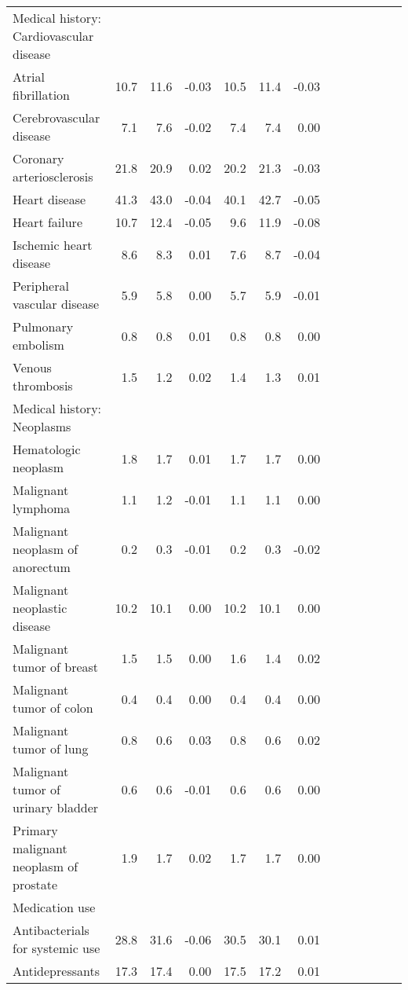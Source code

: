 \documentclass[11pt,]{article}
\begin{document}
\begin{longtable}{lrrrrrrrrrrrr}
  Medical history: Cardiovascular disease &    &    &     &    &    &     \\ 
      Atrial fibrillation & 10.7 & 11.6 & -0.03 & 10.5 & 11.4 & -0.03 \\ 
      Cerebrovascular disease &  7.1 &  7.6 & -0.02 &  7.4 &  7.4 &  0.00 \\ 
      Coronary arteriosclerosis & 21.8 & 20.9 &  0.02 & 20.2 & 21.3 & -0.03 \\ 
      Heart disease & 41.3 & 43.0 & -0.04 & 40.1 & 42.7 & -0.05 \\ 
      Heart failure & 10.7 & 12.4 & -0.05 &  9.6 & 11.9 & -0.08 \\ 
      Ischemic heart disease &  8.6 &  8.3 &  0.01 &  7.6 &  8.7 & -0.04 \\ 
      Peripheral vascular disease &  5.9 &  5.8 &  0.00 &  5.7 &  5.9 & -0.01 \\ 
      Pulmonary embolism &  0.8 &  0.8 &  0.01 &  0.8 &  0.8 &  0.00 \\ 
      Venous thrombosis &  1.5 &  1.2 &  0.02 &  1.4 &  1.3 &  0.01 \\ 
  Medical history: Neoplasms &    &    &     &    &    &     \\ 
      Hematologic neoplasm &  1.8 &  1.7 &  0.01 &  1.7 &  1.7 &  0.00 \\ 
      Malignant lymphoma &  1.1 &  1.2 & -0.01 &  1.1 &  1.1 &  0.00 \\ 
      Malignant neoplasm of anorectum &  0.2 &  0.3 & -0.01 &  0.2 &  0.3 & -0.02 \\ 
      Malignant neoplastic disease & 10.2 & 10.1 &  0.00 & 10.2 & 10.1 &  0.00 \\ 
      Malignant tumor of breast &  1.5 &  1.5 &  0.00 &  1.6 &  1.4 &  0.02 \\ 
      Malignant tumor of colon &  0.4 &  0.4 &  0.00 &  0.4 &  0.4 &  0.00 \\ 
      Malignant tumor of lung &  0.8 &  0.6 &  0.03 &  0.8 &  0.6 &  0.02 \\ 
      Malignant tumor of urinary bladder &  0.6 &  0.6 & -0.01 &  0.6 &  0.6 &  0.00 \\ 
      Primary malignant neoplasm of prostate &  1.9 &  1.7 &  0.02 &  1.7 &  1.7 &  0.00 \\ 
  Medication use &    &    &     &    &    &     \\ 
      Antibacterials for systemic use & 28.8 & 31.6 & -0.06 & 30.5 & 30.1 &  0.01 \\ 
      Antidepressants & 17.3 & 17.4 &  0.00 & 17.5 & 17.2 &  0.01 \\ 

\end{longtable}
\end{document}
